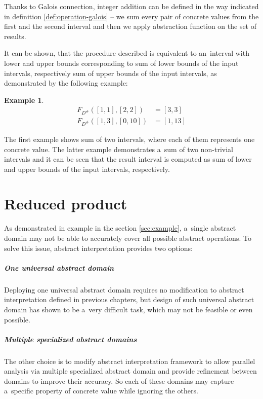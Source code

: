 \documentclass[12pt,oneside]{fithesis2}
\theoremstyle{definition}
\newtheorem{exmp}{Example}[section]
\begin{document}
Thanks to Galois connection, integer addition can be defined in the way indicated in definition \ref{def:operation-galois} -- we sum every pair of concrete values from the first and the second interval and then we apply abstraction function on the set of results.

It can be shown, that the procedure described is equivalent to an~interval with lower and upper bounds corresponding to sum of lower bounds of the input intervals, respectively sum of upper bounds of the input intervals, as demonstrated by the following example:

\begin{exmp}
  \begin{align*}
    F_{D^\#}([1,1], [2,2]) &= [3,3]\\
    F_{D^\#}([1,3], [0,10]) &= [1,13]
  \end{align*}
\end{exmp}

The first example shows sum of two intervals, where each of them represents one concrete value. The latter example demonstrates a~sum of two non-trivial intervals and it can be seen that the result interval is computed as sum of lower and upper bounds of the input intervals, respectively.

\chapter{Reduced product}\label{ch:reduced-product}

As demonstrated in example in the section \ref{sec:example}, a~single abstract domain may not be able to accurately cover all possible abstract operations. To solve this issue, abstract interpretation provides two options:

\paragraph{One universal abstract domain}
Deploying one universal abstract domain requires no modification to abstract interpretation defined in previous chapters, but design of such universal abstract domain has shown to be a~very difficult task, which may not be feasible or even possible.

\paragraph{Multiple specialized abstract domains}
The other choice is to modify abstract interpretation framework to allow parallel analysis via multiple specialized abstract domain and provide refinement between domains to improve their accuracy. So each of these domains may capture a~specific property of concrete value while ignoring the others.
\end{document}
